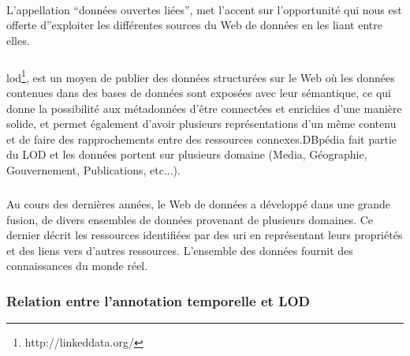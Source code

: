 \documentclass[12pt,a4]{report}
\begin{document}
\paragraph{}
L'appellation ``données ouvertes liées'', met l'accent sur l'opportunité qui nous est offerte d''exploiter les différentes sources du Web de données en les liant entre elles. 
\subparagraph{}
\gls{lod}\footnote{http://linkeddata.org/}, est un moyen de publier des données structurées sur le Web où les données contenues dans des bases de données sont exposées avec leur sémantique, ce qui donne la possibilité aux métadonnées d'être connectées et enrichies d'une manière solide, et permet également d'avoir plusieurs représentations d'un même contenu et de faire des rapprochements entre des ressources connexes.DBpédia fait partie du LOD et les données portent sur plusieurs domaine (Media, Géographie, Gouvernement, Publications, etc...).
\subparagraph{}
Au cours des dernières années, le Web de données a développé dans une grande fusion, de divers ensembles de données provenant de plusieurs domaines. Ce dernier décrit les ressources identifiées par des \gls{uri} en représentant leurs propriétés et des liens vers d’autres ressources. L'ensemble des données fournit des connaissances du monde réel.
\subsubsection{Relation entre l'annotation temporelle et LOD}
\end{document}
